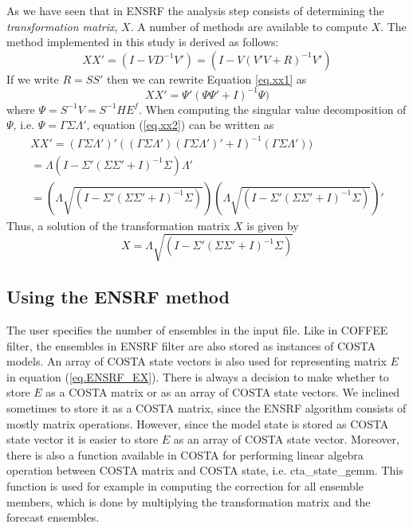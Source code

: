 As we have seen that in ENSRF the analysis step consists of determining the
\emph{transformation matrix}, $X$. A number of methods are available to compute
$X$. The method implemented in this study is derived as follows:
\begin{equation}
  \label{eq.xx1}
  X X'=(I-V D^{-1} V') = (I-V (V' V + R)^{-1} V')
\end{equation}
If we write $R=SS'$ then we can rewrite Equation \ref{eq.xx1} as
\begin{equation}
  \label{eq.xx2}
  X X'= \Psi' (\Psi \Psi' + I)^{-1} \Psi)
\end{equation}
where $\Psi=S^{-1}V=S^{-1}HE^f$. When computing the singular value
decomposition of $\Psi$, i.e. $\Psi=\Gamma \Sigma \Lambda'$, equation
(\ref{eq.xx2}) can be written as
\begin{eqnarray}
  X X'= (\Gamma \Sigma \Lambda')' ((\Gamma \Sigma \Lambda') (\Gamma \Sigma \Lambda')' + I)^{-1} (\Gamma \Sigma \Lambda')) \\
  = \Lambda (I-\Sigma' (\Sigma \Sigma'+I)^{-1} \Sigma) \Lambda' \\
  = (\Lambda \sqrt{(I-\Sigma' (\Sigma \Sigma'+I)^{-1} \Sigma)})(\Lambda \sqrt{(I-\Sigma' (\Sigma \Sigma'+I)^{-1} \Sigma)})'
\end{eqnarray}
Thus, a solution of the transformation matrix $X$ is given by
\begin{equation}
  X = \Lambda \sqrt{(I-\Sigma' (\Sigma \Sigma'+I)^{-1} \Sigma)}
\end{equation}
%           

\subsection{Using the ENSRF method}

The user specifies the number of ensembles in the input file. Like in COFFEE
filter, the ensembles in ENSRF filter are also stored as instances of COSTA
models. An array of COSTA state vectors is also used for representing matrix
$E$ in equation (\ref{eq.ENSRF_EX}). There is always a decision to make whether
to store $E$ as a COSTA matrix or as an array of COSTA state vectors. We
inclined sometimes to store it as a COSTA matrix, since the ENSRF algorithm
consists of mostly matrix operations. However, since the model state is stored
as COSTA state vector it is easier to store $E$ as an array of COSTA state
vector. Moreover, there is also a function available in COSTA for performing
linear algebra operation between COSTA matrix and COSTA state, i.e.
cta\_state\_gemm. This function is used for example in computing the correction
for all ensemble members, which is done by multiplying the transformation
matrix and the forecast ensembles.

